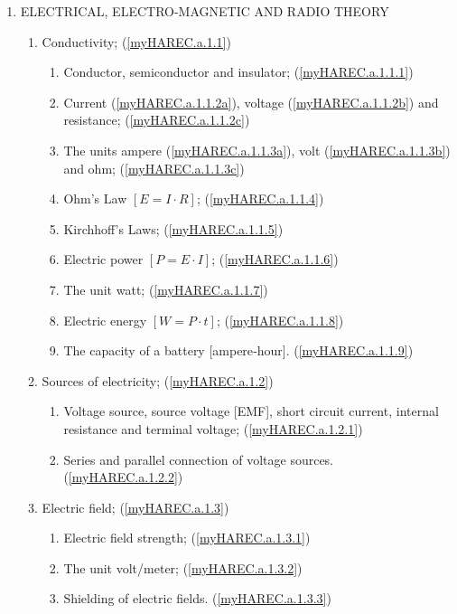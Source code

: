 \renewcommand{\labelenumi}{\theenumi.}
\renewcommand{\theenumii}{\arabic{enumii}}
\renewcommand{\labelenumii}{\theenumi.\theenumii}
\begin{enumerate}
\item ELECTRICAL, ELECTRO-MAGNETIC AND RADIO THEORY
\begin{enumerate}[noitemsep]

\item Conductivity; (\ref{myHAREC.a.1.1})\label{HAREC.a.1.1}
\begin{enumerate}[noitemsep]
\item Conductor, semiconductor and insulator; (\ref{myHAREC.a.1.1.1})\label{HAREC.a.1.1.1}
\item Current (\ref{myHAREC.a.1.1.2a}), voltage (\ref{myHAREC.a.1.1.2b}) and resistance; (\ref{myHAREC.a.1.1.2c})\label{HAREC.a.1.1.2}
\item The units ampere (\ref{myHAREC.a.1.1.3a}), volt (\ref{myHAREC.a.1.1.3b}) and ohm; (\ref{myHAREC.a.1.1.3c})\label{HAREC.a.1.1.3}
\item Ohm's Law  $\left[E = I \cdot R\right]$; (\ref{myHAREC.a.1.1.4})\label{HAREC.a.1.1.4}
\item Kirchhoff's Laws; (\ref{myHAREC.a.1.1.5})\label{HAREC.a.1.1.5}
\item Electric power $\left[P = E \cdot I\right]$; (\ref{myHAREC.a.1.1.6})\label{HAREC.a.1.1.6}
\item The unit watt; (\ref{myHAREC.a.1.1.7})\label{HAREC.a.1.1.7}
\item Electric energy $\left[W = P \cdot t\right]$; (\ref{myHAREC.a.1.1.8})\label{HAREC.a.1.1.8}
\item The capacity of a battery [ampere‑hour]. (\ref{myHAREC.a.1.1.9})\label{HAREC.a.1.1.9}
\end{enumerate}

\item Sources of electricity; (\ref{myHAREC.a.1.2})\label{HAREC.a.1.2}
\begin{enumerate}[noitemsep]
\item Voltage source, source voltage [EMF], short circuit current, inter­nal resistance and terminal voltage; (\ref{myHAREC.a.1.2.1})\label{HAREC.a.1.2.1}
\item Series and parallel connection of voltage sources. (\ref{myHAREC.a.1.2.2})\label{HAREC.a.1.2.2}
\end{enumerate}

\item Electric field; (\ref{myHAREC.a.1.3})\label{HAREC.a.1.3}
\begin{enumerate}[noitemsep]
\item Electric field strength; (\ref{myHAREC.a.1.3.1})\label{HAREC.a.1.3.1}
\item The unit volt/meter; (\ref{myHAREC.a.1.3.2})\label{HAREC.a.1.3.2}
\item Shielding of electric fields. (\ref{myHAREC.a.1.3.3})\label{HAREC.a.1.3.3}
\end{enumerate}


\end{enumerate}
\end{enumerate}
